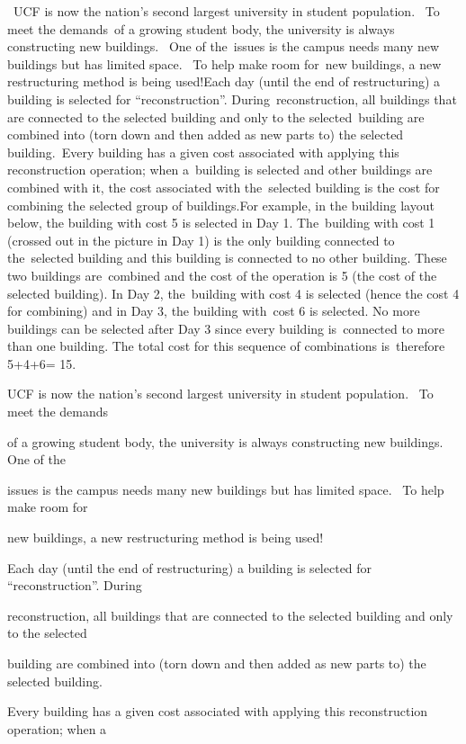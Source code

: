 

 UCF is now the nation’s second largest university in student population.  To meet the demands of a growing student body, the university is always constructing new buildings.  One of the issues is the campus needs many new buildings but has limited space.  To help make room for new buildings, a new restructuring method is being used!Each day (until the end of restructuring) a building is selected for “reconstruction”. During reconstruction, all buildings that are connected to the selected building and only to the selected building are combined into (torn down and then added as new parts to) the selected building. Every building has a given cost associated with applying this reconstruction operation; when a building is selected and other buildings are combined with it, the cost associated with the selected building is the cost for combining the selected group of buildings.For example, in the building layout below, the building with cost 5 is selected in Day 1. The building with cost 1 (crossed out in the picture in Day 1) is the only building connected to the selected building and this building is connected to no other building. These two buildings are combined and the cost of the operation is 5 (the cost of the selected building). In Day 2, the building with cost 4 is selected (hence the cost 4 for combining) and in Day 3, the building with cost 6 is selected. No more buildings can be selected after Day 3 since every building is connected to more than one building. The total cost for this sequence of combinations is therefore 5+4+6= 15.

UCF is now the nation’s second largest university in student population.  To meet the demands 

of a growing student body, the university is always constructing new buildings.  One of the 

issues is the campus needs many new buildings but has limited space.  To help make room for 

new buildings, a new restructuring method is being used!

Each day (until the end of restructuring) a building is selected for “reconstruction”. During 

reconstruction, all buildings that are connected to the selected building and only to the selected 

building are combined into (torn down and then added as new parts to) the selected building. 

Every building has a given cost associated with applying this reconstruction operation; when a 

